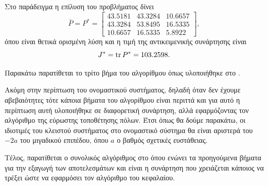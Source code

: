 Στο παράδειγμα η επίλυση του προβλήματος  δίνει
\[
    \bar{P} = P^* =
    \begin{bmatrix}
        43.5181 & 43.3284 & 10.6657 \\
        43.3284 & 53.8495 & 16.5335 \\
        10.6657 & 16.5335 &  5.8922
    \end{bmatrix},
\]
όπου είναι θετικά ορισμένη λύση και η τιμή της αντικειμενικής συνάρτησης είναι
\[
    J^* = \operatorname{tr} P^* = 103.2598.
\]

Παρακάτω παρατίθεται το τρίτο βήμα του αλγορίθμου όπως υλοποιήθηκε στο
.
\eng{}

Ακόμη στην περίπτωση του ονομαστικού συστήματος, δηλαδή όταν δεν έχουμε
αβεβαιότητες τότε κάποια βήματα του αλγορίθμου είναι περιττά και για αυτό η
περίπτωση αυτή υλοποιήθηκε σε διαφορετική συνάρτηση, αλλά εφαρμόζοντας τον
αλγόριθμο της εύρωστης τοποθέτησης πόλων. Έτσι όπως θα δούμε παρακάτω, οι
ιδιοτιμές του κλειστού συστήματος στο ονομαστικό σύστημα θα είναι αριστερά του
\( -2a \) του μιγαδικού επιπέδου, όπου \( a \) ο βαθμός σχετικές ευστάθειας.
\eng{}

Τέλος, παρατίθεται ο συνολικός αλγόριθμος στο  όπου ενώνει τα
προηγούμενα βήματα για την εξαγωγή των αποτελεσμάτων και είναι η συνάρτηση που
χρειάζεται κάποιος να τρέξει ώστε να εφαρμόσει τον αλγόριθμο του κεφαλαίου.
\eng{}

